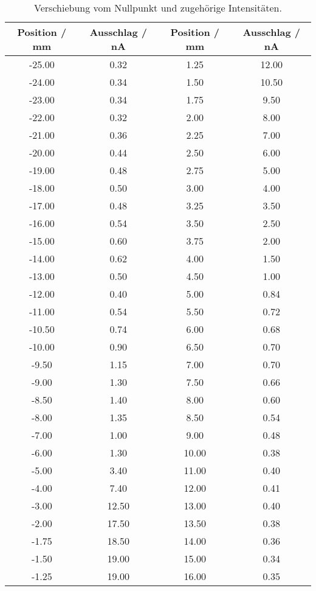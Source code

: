 \begin{table}[!htp]
\centering
\caption{Verschiebung vom Nullpunkt und zugehörige Intensitäten.}
\label{tab:spalt1}
\begin{tabular}{c c c c}
\toprule
{{Position / mm}} & {{Ausschlag / nA}} & {{Position / mm}} & {{Ausschlag / nA}} \\
\midrule
-25.00   & 0.32  & 1.25    & 12.00 \\
-24.00   & 0.34  &1.50     & 10.50 \\
-23.00   & 0.34  &1.75     & 9.50 \\
-22.00   & 0.32  &2.00     & 8.00 \\
-21.00   & 0.36  &2.25     & 7.00 \\
-20.00   & 0.44  &2.50     & 6.00 \\
-19.00   & 0.48  &2.75     & 5.00 \\
-18.00   & 0.50  &3.00     & 4.00 \\
-17.00   & 0.48  &3.25     & 3.50 \\
-16.00   & 0.54  &3.50     & 2.50 \\
-15.00   & 0.60  &3.75     & 2.00 \\
-14.00   & 0.62  &4.00     & 1.50 \\
-13.00   & 0.50  &4.50     & 1.00 \\
-12.00   & 0.40  &5.00     & 0.84 \\
-11.00   & 0.54  &5.50     & 0.72 \\
-10.50   & 0.74  &6.00     & 0.68 \\
-10.00   & 0.90  &6.50     & 0.70 \\
-9.50    & 1.15  &7.00     & 0.70 \\
-9.00    & 1.30  &7.50     & 0.66 \\
-8.50    & 1.40  &8.00     & 0.60 \\
-8.00    & 1.35  &8.50     & 0.54 \\
-7.00    & 1.00  &9.00     & 0.48 \\
-6.00    & 1.30  &10.00    & 0.38 \\
-5.00    & 3.40  &11.00    & 0.40 \\
-4.00    & 7.40  &12.00    & 0.41 \\
-3.00    & 12.50 &13.00    & 0.40 \\
-2.00    & 17.50 &13.50    & 0.38 \\
-1.75    & 18.50 &14.00    & 0.36 \\
-1.50    & 19.00 &15.00    & 0.34 \\
-1.25    & 19.00 &16.00    & 0.35 \\

\end{tabular}
\end{table}
